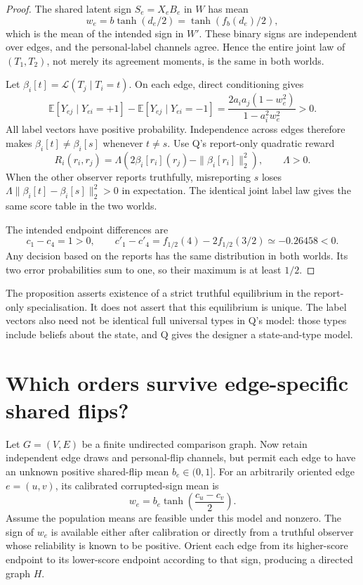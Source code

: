 \documentclass{article}
\begin{document}
\begin{proof}
The shared latent sign \(S_e=X_eB_e\) in \(W\) has mean
\[
w_e=b\tanh(d_e/2)=\tanh(f_b(d_e)/2),
\]
which is the mean of the intended sign in \(W'\). These binary signs are independent over edges, and the
personal-label channels agree. Hence the entire joint law of \((T_1,T_2)\), not merely its agreement
moments, is the same in both worlds. %

Let \(\beta_i[t]=\mathcal L(T_j\mid T_i=t)\). On each edge, direct conditioning gives
\[
\mathbb E[Y_{ej}\mid Y_{ei}=+1]
-\mathbb E[Y_{ej}\mid Y_{ei}=-1]
=\frac{2a_i a_j(1-w_e^2)}{1-a_i^2w_e^2}>0.
\]
All label vectors have positive probability. Independence across edges therefore makes
\(\beta_i[t]\ne\beta_i[s]\) whenever \(t\ne s\). Use Q's report-only quadratic reward
\[
R_i(r_i,r_j)=\Lambda\left(2\beta_i[r_i](r_j)
-\|\beta_i[r_i]\|_2^2\right),\qquad \Lambda>0.
\]
When the other observer reports truthfully, misreporting \(s\) loses
\(\Lambda\|\beta_i[t]-\beta_i[s]\|_2^2>0\) in expectation. The identical joint label law gives the same
score table in the two worlds. %

The intended endpoint differences are
\[
c_1-c_4=1>0,
\qquad
c'_1-c'_4=f_{1/2}(4)-2f_{1/2}(3/2)\simeq-0.26458<0.
\]
Any decision based on the reports has the same distribution in both worlds. Its two error probabilities
sum to one, so their maximum is at least \(1/2\). %
\end{proof}

The proposition asserts existence of a strict truthful equilibrium in the report-only specialisation. It
does not assert that this equilibrium is unique. The label vectors also need not be identical full
universal types in Q's model: those types include beliefs about the state, and Q gives the designer a
state-and-type model. %

\section{Which orders survive edge-specific shared flips?}

Let \(G=(V,E)\) be a finite undirected comparison graph.
Now retain independent edge draws and personal-flip channels, but permit each edge to have an unknown
positive shared-flip mean \(b_e\in(0,1]\). For an arbitrarily oriented edge \(e=(u,v)\), its calibrated
corrupted-sign mean is
\[
w_e=b_e\tanh\!\left(\frac{c_u-c_v}{2}\right).
\]
Assume the population means are feasible under this model and nonzero. The sign of \(w_e\) is available
either after calibration or directly from a truthful observer whose reliability is known to be positive.
Orient each edge from its higher-score endpoint to its lower-score endpoint according to that sign,
producing a directed graph \(H\). %
\end{document}
